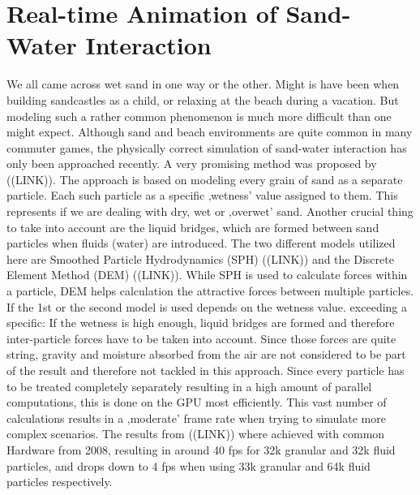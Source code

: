 \section{Real-time Animation of Sand-Water Interaction}
\cite{rungjiratananon2008real}
We all came across wet sand in one way or the other. Might is have been when building sandcastles as a child, or relaxing at the beach during a vacation. But modeling such a rather common phenomenon is much more difficult than one might expect. Although sand and beach environments are quite common in many commuter games, the physically correct simulation of sand-water interaction has only been approached recently. A very promising method was proposed by ((LINK)). The approach is based on modeling every grain of sand as a separate particle. Each such particle as a specific ‚wetness’ value assigned to them. This represents if we are dealing with dry, wet or ‚overwet’ sand. Another crucial thing to take into account are the liquid bridges, which are formed between sand particles when fluids (water) are introduced.
The two different models utilized here are Smoothed Particle Hydrodynamics (SPH) ((LINK)) and the Discrete Element Method (DEM) ((LINK)). While SPH is used to calculate forces within a particle, DEM helps calculation the attractive forces between multiple particles. If the 1st or the second model is used depends on the wetness value. exceeding a specific: If the wetness is high enough, liquid bridges are formed and therefore inter-particle forces have to be taken into account. Since those forces are quite string, gravity and moisture absorbed from the air are not considered to be part of the result and therefore not tackled in this approach.
Since every particle has to be treated completely separately resulting in a high amount of parallel computations, this is done on the GPU most efficiently. This vast number of calculations results in a ‚moderate’ frame rate when trying to simulate more complex scenarios. The results from ((LINK)) where achieved with common Hardware from 2008, resulting in around 40 fps for 32k granular and 32k fluid particles, and drops down to 4 fps when using 33k granular and 64k fluid particles respectively.

